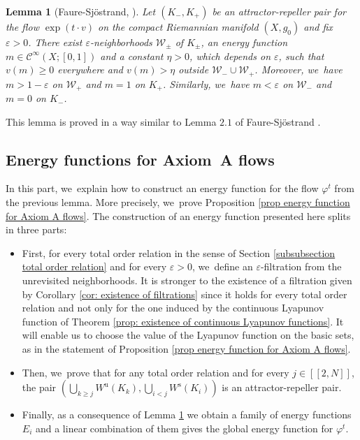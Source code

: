 \documentclass[JEP,XML,SOM,Unicode,NoEqCountersInSection,NoFloatCountersInSection,published]{cedram}
\newcommand{\lcr}{[\![}
\newcommand{\rcr}{]\!]}
\newcommand{\rs}{\mathrm{s}}
\newcommand{\ru}{\mathrm{u}}
\theoremstyle{definition}
\theoremstyle{plain}
\newtheorem{lemma}[definition]{Lemma}
\newcommand{\Ccal}{\mathcal{C}}
\newcommand{\Wcal}{\mathcal{W}}
\begin{document}
\begin{lemma}[{Faure-Sjöstrand, \cite{FS}}]\label{lemma: energy function for attractor-repeller model}
Let $(K_-,K_+)$ be an attractor-repeller pair for the flow $\exp (t\cdot v)$ on the compact Riemannian manifold $(X,g_0)$ and fix $\varepsilon > 0$. There exist $\varepsilon$-neighborhoods $\Wcal_{\pm}$ of $K_{\pm}$, an energy function $m \in \Ccal^{\infty} (X; [0,1])$ and a constant $\eta > 0$, which depends on $\varepsilon$, such that $v (m) \geq 0$ everywhere and $v (m) > \eta$ outside $\Wcal_{-} \cup \Wcal_{+}$. Moreover, we~have $m > 1 - \varepsilon$ on $\Wcal_{+}$ and $m = 1$ on $K_+$. Similarly, we~have $m < \varepsilon$ on $\Wcal_{-}$ and $m = 0$ on $K_-$.
\end{lemma}

This lemma is proved in a way similar to Lemma $2.1$ of Faure-Sjöstrand \cite[p.\,336]{FS}.

\subsection{Energy functions for Axiom~A flows}

In this part, we~explain how to construct an energy function for the flow $\varphi^t$ from the previous lemma. More precisely, we~prove Proposition \ref{prop energy function for Axiom A flows}. The construction of an energy function presented here splits in three parts:
\begin{itemize}
\item First, for every total order relation in the sense of Section \ref{subsubsection total order relation} and for every $\varepsilon > 0$, we~define an $\varepsilon$-filtration from the unrevisited neighborhoods. It is stronger to the existence of a filtration given by Corollary \ref{cor: existence of filtrations} since it holds for every total order relation and not only for the one induced by the continuous Lyapunov function of Theorem \ref{prop: existence of continuous Lyapunov functions}. It will enable us to choose the value of the Lyapunov function on the basic sets, as in the statement of Proposition \ref{prop energy function for Axiom A flows}.
\item Then, we~prove that for any total order relation and for every $j\in\lcr2,N\rcr$, the pair $(\bigcup_{k \geq j}W^\ru (K_k), \bigcup_{i < j}W^\rs (K_i))$ is an attractor-repeller pair.
\item Finally, as a consequence of Lemma \ref{lemma: energy function for attractor-repeller model} we obtain a family of energy functions~$E_i$ and a linear combination of them gives the global energy function for $\varphi^t$.
\end{itemize}
\end{document}

